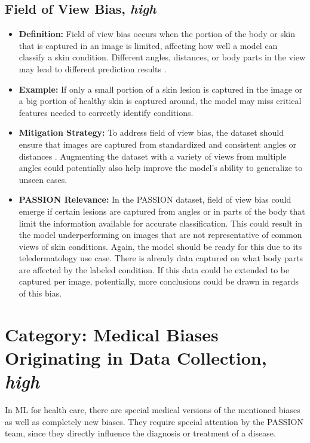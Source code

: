 \documentclass[12pt, a4paper, oneside]{book}   	%
\begin{document}
\begin{appendices}
		\subsection{Field of View Bias, \textit{high}}
		\begin{itemize}
			\item \textbf{Definition:} Field of view bias occurs when the portion of the body or skin that is captured in an image is limited, affecting how well a model can classify a skin condition. Different angles, distances, or body parts in the view may lead to different prediction results \autocite{Mishra_2019, Young_2020}.
			\item \textbf{Example:} If only a small portion of a skin lesion is captured in the image or a big portion of healthy skin is captured around, the model may miss critical features needed to correctly identify conditions.
			\item \textbf{Mitigation Strategy:} To address field of view bias, the dataset should ensure that images are captured from standardized and consistent angles or distances \autocite{Young_2020}. Augmenting the dataset with a variety of views from multiple angles could potentially also help improve the model's ability to generalize to unseen cases.
			\item \textbf{PASSION Relevance:} In the PASSION dataset, field of view bias could emerge if certain lesions are captured from angles or in parts of the body that limit the information available for accurate classification. This could result in the model underperforming on images that are not representative of common views of skin conditions. Again, the model should be ready for this due to its \gls{teledermatology} use case. There is already data captured on what body parts are affected by the labeled condition. If this data could be extended to be captured per image, potentially, more conclusions could be drawn in regards of this bias. 
		\end{itemize}
		
		\section{Category: Medical Biases Originating in Data Collection, \textit{high}} \label{app:biasCategoryMedicalBiasesHigh}
		In \gls{ML} for health care, there are special medical versions of the mentioned biases as well as completely new biases. They require special attention by the PASSION team, since they directly influence the diagnosis or treatment of a disease.
		

\end{appendices}
\end{document}
